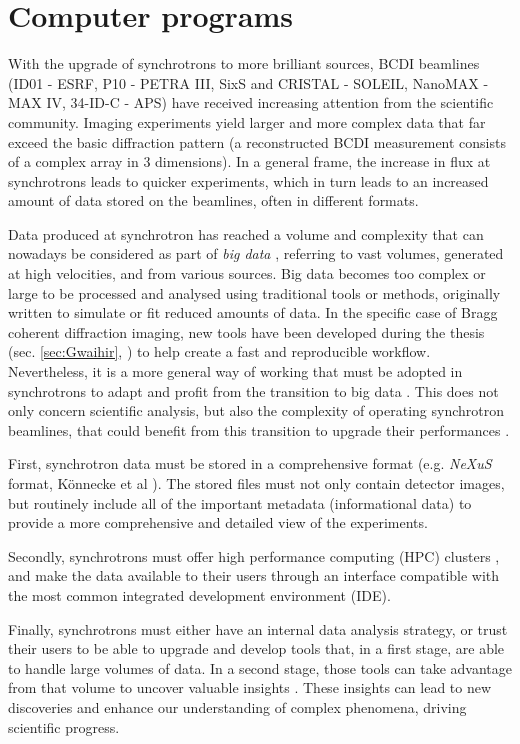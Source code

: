 \section{Computer programs}

With the upgrade of synchrotrons to more brilliant sources, BCDI beamlines (ID01 - ESRF, P10 - PETRA III, SixS and CRISTAL - SOLEIL, NanoMAX - MAX IV, 34-ID-C - APS) have received increasing attention from the scientific community.
Imaging experiments yield larger and more complex data that far exceed the basic diffraction pattern (a reconstructed BCDI measurement consists of a complex array in 3 dimensions).
In a general frame, the increase in flux at synchrotrons leads to quicker experiments, which in turn leads to an increased amount of data stored on the beamlines, often in different formats.

Data produced at synchrotron has reached a volume and complexity that can nowadays be considered as part of \textit{big data} \parencite{Alizada2017, Wang2018}, referring to vast volumes, generated at high velocities, and from various sources.
Big data becomes too complex or large to be processed and analysed using traditional tools or methods, originally written to simulate or fit reduced amounts of data.
In the specific case of Bragg coherent diffraction imaging, new tools have been developed during the thesis (sec. \ref{sec:Gwaihir}, \cite{Carnis2021c, Simonne2022}) to help create a fast and reproducible workflow.
Nevertheless, it is a more general way of working that must be adopted in synchrotrons to adapt and profit from the transition to big data \parencite{Wang2018}.
This does not only concern scientific analysis, but also the complexity of operating synchrotron beamlines, that could benefit from this transition to upgrade their performances \parencite{Diadem}.

First, synchrotron data must be stored in a comprehensive format (e.g. \textit{NeXuS} format, Könnecke et al \cite{Konnecke2015}).
The stored files must not only contain detector images, but routinely include all of the important metadata (informational data) to provide a more comprehensive and detailed view of the experiments.

Secondly, synchrotrons must offer high performance computing (HPC) clusters \parencite{Wang2021}, and make the data available to their users through an interface compatible with the most common integrated development environment (IDE).

Finally, synchrotrons must either have an internal data analysis strategy, or trust their users to be able to upgrade and develop tools that, in a first stage, are able to handle large volumes of data.
In a second stage, those tools can take advantage from that volume to uncover valuable insights \parencite{Wang2016a, Khaleghi2019}.
These insights can lead to new discoveries and enhance our understanding of complex phenomena, driving scientific progress.

